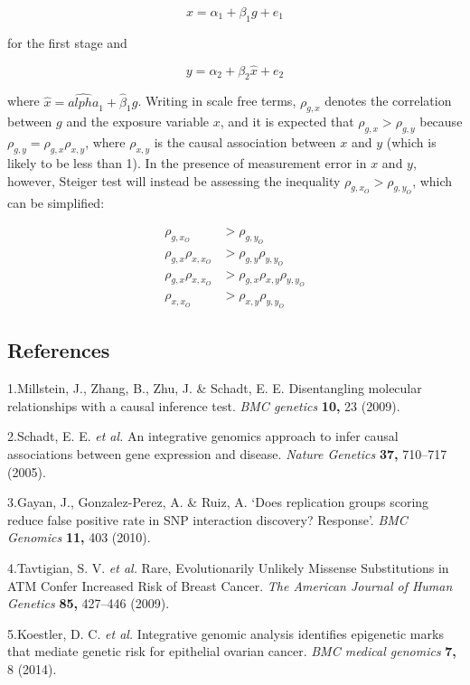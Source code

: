 \documentclass[]{article}
\begin{document}
\[
x = \alpha_1 + \beta_1 g + e_1
\]

for the first stage and

\[
y = \alpha_2 + \beta_2 \hat{x} + e_2
\]

where \(\hat{x} = \hat{alpha}_1 + \hat{\beta}_1 g\). Writing in scale
free terms, \(\rho_{g, x}\) denotes the correlation between \(g\) and
the exposure variable \(x\), and it is expected that
\(\rho_{g, x} > \rho_{g, y}\) because
\(\rho_{g, y} = \rho_{g, x}\rho_{x, y}\), where \(\rho_{x, y}\) is the
causal association between \(x\) and \(y\) (which is likely to be less
than 1). In the presence of measurement error in \(x\) and \(y\),
however, Steiger test will instead be assessing the inequality
\(\rho_{g, x_O} > \rho_{g, y_O}\), which can be simplified:

\[
\begin{aligned}
\rho_{g, x_O} & > \rho_{g, y_O} \\
\rho_{g, x} \rho_{x, x_O} & > \rho_{g,y}\rho_{y,y_O}\\
\rho_{g, x} \rho_{x, x_O} & > \rho_{g,x}\rho_{x,y}\rho_{y,y_O}\\
\rho_{x, x_O} & > \rho_{x,y}\rho_{y,y_O}
\end{aligned}
\]

\newpage

\subsection*{References}\label{references}

1.Millstein, J., Zhang, B., Zhu, J. \& Schadt, E. E. Disentangling
molecular relationships with a causal inference test. \emph{BMC
genetics} \textbf{10,} 23 (2009).

2.Schadt, E. E. \emph{et al.} An integrative genomics approach to infer
causal associations between gene expression and disease. \emph{Nature
Genetics} \textbf{37,} 710--717 (2005).

3.Gayan, J., Gonzalez-Perez, A. \& Ruiz, A. `Does replication groups
scoring reduce false positive rate in SNP interaction discovery?
Response'. \emph{BMC Genomics} \textbf{11,} 403 (2010).

4.Tavtigian, S. V. \emph{et al.} Rare, Evolutionarily Unlikely Missense
Substitutions in ATM Confer Increased Risk of Breast Cancer. \emph{The
American Journal of Human Genetics} \textbf{85,} 427--446 (2009).

5.Koestler, D. C. \emph{et al.} Integrative genomic analysis identifies
epigenetic marks that mediate genetic risk for epithelial ovarian
cancer. \emph{BMC medical genomics} \textbf{7,} 8 (2014).
\end{document}
